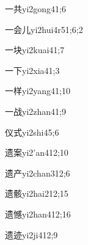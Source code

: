 \begin{verbete}{一共}{yi2gong4}{1;6}
\end{verbete}

\begin{verbete}{一会儿}{yi2hui4r5}{1;6;2}
\end{verbete}

\begin{verbete}{一块}{yi2kuai4}{1;7}
\end{verbete}

\begin{verbete}{一下}{yi2xia4}{1;3}
\end{verbete}

\begin{verbete}{一样}{yi2yang4}{1;10}
\end{verbete}

\begin{verbete}{一战}{yi2zhan4}{1;9}
\end{verbete}

\begin{verbete}{仪式}{yi2shi4}{5;6}
\end{verbete}

\begin{verbete}{遗案}{yi2'an4}{12;10}
\end{verbete}

\begin{verbete}{遗产}{yi2chan3}{12;6}
\end{verbete}

\begin{verbete}{遗骸}{yi2hai2}{12;15}
\end{verbete}

\begin{verbete}{遗憾}{yi2han4}{12;16}
\end{verbete}

\begin{verbete}{遗迹}{yi2ji4}{12;9}
\end{verbete}

